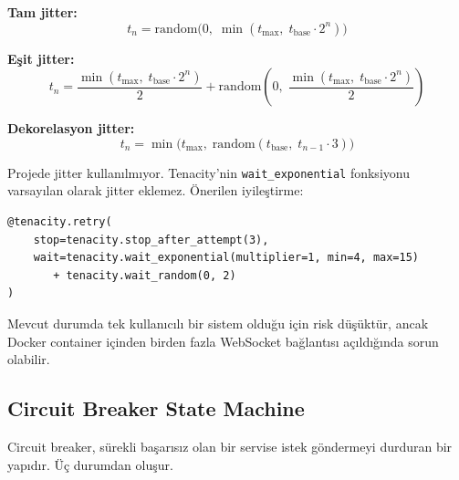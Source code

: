 \begin{formulbox}
\textbf{Tam jitter:}
\begin{equation}
t_n = \mathrm{random}\bigl(0,\; \min(t_{\max},\; t_{\text{base}} \cdot 2^n)\bigr)
\label{eq:full-jitter}
\end{equation}

\textbf{E\c{s}it jitter:}
\begin{equation}
t_n = \frac{\min(t_{\max},\; t_{\text{base}} \cdot 2^n)}{2} + \mathrm{random}\!\left(0,\; \frac{\min(t_{\max},\; t_{\text{base}} \cdot 2^n)}{2}\right)
\label{eq:equal-jitter}
\end{equation}

\textbf{Dekorelasyon jitter:}
\begin{equation}
t_n = \min\bigl(t_{\max},\; \mathrm{random}(t_{\text{base}},\; t_{n-1} \cdot 3)\bigr)
\label{eq:decorr-jitter}
\end{equation}
\end{formulbox}

\begin{dikkat}
Projede jitter kullan{\i}lm{\i}yor. Tenacity'nin \texttt{wait\_exponential} fonksiyonu varsay{\i}lan olarak jitter eklemez. \"{O}nerilen iyile\c{s}tirme:
\begin{lstlisting}
@tenacity.retry(
    stop=tenacity.stop_after_attempt(3),
    wait=tenacity.wait_exponential(multiplier=1, min=4, max=15)
       + tenacity.wait_random(0, 2)
)
\end{lstlisting}
Mevcut durumda tek kullan{\i}c{\i}l{\i} bir sistem oldu\u{g}u i\c{c}in risk d\"{u}\c{s}\"{u}kt\"{u}r, ancak Docker container i\c{c}inden birden fazla WebSocket ba\u{g}lant{\i}s{\i} a\c{c}{\i}ld{\i}\u{g}{\i}nda sorun olabilir.
\end{dikkat}


\subsection{Circuit Breaker State Machine}
\label{sec:llm-circuit-breaker}

Circuit breaker, s\"{u}rekli ba\c{s}ar{\i}s{\i}z olan bir servise istek g\"{o}ndermeyi durduran bir yap{\i}d{\i}r. \"{U}\c{c} durumdan olu\c{s}ur.

